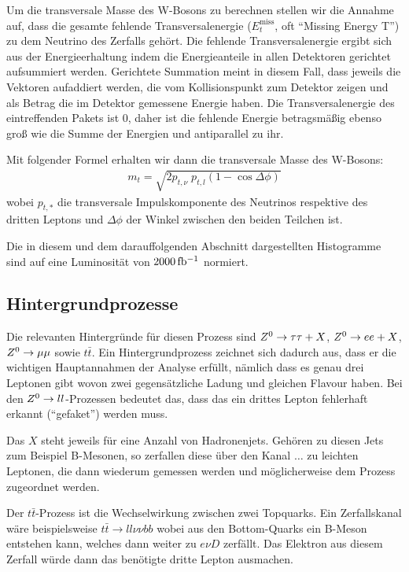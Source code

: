 Um die transversale Masse des W-Bosons zu berechnen stellen wir die Annahme auf,
dass die gesamte fehlende Transversalenergie ($E_t^\text{miss}$, oft "`Missing
Energy T"') zu dem Neutrino des Zerfalls gehört. Die fehlende Transversalenergie
ergibt sich aus der Energieerhaltung indem die Energieanteile in allen
Detektoren gerichtet aufsummiert werden. Gerichtete Summation meint in diesem
Fall, dass jeweils die Vektoren aufaddiert werden, die vom Kollisionspunkt zum
Detektor zeigen und als Betrag die im Detektor gemessene Energie haben. Die
Transversalenergie des eintreffenden Pakets ist $0$, daher ist die fehlende
Energie betragsmäßig ebenso groß wie die Summe der Energien und antiparallel zu
ihr.

Mit folgender Formel erhalten wir dann die transversale Masse des W-Bosons: 
\begin{align}
  m_t = \sqrt{2 p_{t,\nu}\; p_{t,l} (1 - \cos{\Delta\phi})}
  \label{eqn:trans}
\end{align}
wobei $p_{t,*}$ die transversale Impulskomponente des Neutrinos respektive des
dritten Leptons und $\Delta\phi$ der Winkel zwischen den beiden Teilchen ist.

Die in diesem und dem darauffolgenden Abschnitt dargestellten Histogramme sind
auf eine Luminosität von $\unit[2000]{fb^{-1}}$ normiert.

\subsection{Hintergrundprozesse}
Die relevanten Hintergründe für diesen Prozess sind $Z^0\to\tau\tau + X$, $Z^0\to
e e + X$, $Z^0\to\mu\mu$ sowie $t\bar{t}$. Ein Hintergrundprozess zeichnet sich
dadurch aus, dass er die wichtigen Hauptannahmen der Analyse erfüllt, nämlich
dass es genau drei Leptonen gibt wovon zwei gegensätzliche Ladung und gleichen
Flavour haben. Bei den $Z^0\to ll$-Prozessen bedeutet das, dass das ein drittes
Lepton fehlerhaft erkannt ("`gefaket"') werden muss.

Das $X$ steht jeweils für eine Anzahl von Hadronenjets. Gehören zu diesen Jets
zum Beispiel B-Mesonen, so zerfallen diese über den Kanal $\dots$ zu leichten
Leptonen, die dann wiederum gemessen werden und möglicherweise dem Prozess
zugeordnet werden.

Der $t\bar{t}$-Prozess ist die Wechselwirkung zwischen zwei Topquarks. Ein
Zerfallskanal wäre beispielsweise $t\bar t\to ll\nu\nu bb$ wobei aus den
Bottom-Quarks ein B-Meson entstehen kann, welches dann weiter zu $e\nu D$
zerfällt. Das Elektron aus diesem Zerfall würde dann das benötigte dritte Lepton
ausmachen.

